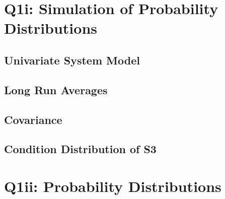 \documentclass[12pt]{article}
\begin{document}
\tableofcontents
{}
\thispagestyle{empty}
\cleardoublepage
\setcounter{page}{1}

\section{Q1i: Simulation of Probability Distributions}
\subsection{Univariate System Model}
\subsection{Long Run Averages}
\subsection{Covariance}
\subsection{Condition Distribution of S3}
\clearpage

\section{Q1ii: Probability Distributions}
\end{document}
